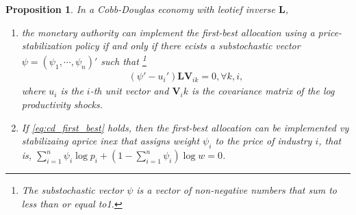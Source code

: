 \documentclass[12pt]{article}
\newtheorem{proposition}{Proposition}
\numberwithin{equation}{section}
\begin{document}
\begin{proposition}
    In a Cobb-Douglas economy with leotief inverse $\mathbf{L}$,
    \begin{enumerate}
        \item the monetary authority can implement the first-best allocation using a price-stabilization policy if and only if there ecists a substochastic vector $\psi = (\psi_1, \cdots, \psi_n)'$ such that \footnote{The substochastic vector $\psi$ is a vector of non-negative numbers that sum to less than or equal to1.}
        \begin{align}\label{eq:cd_first_best}
            (\psi' - u_i') \mathbf{L}\mathbf{V}_{ik}=0, \forall k, i,
        \end{align}
        where $u_i$ is the $i$-th unit vector and $\mathbf{V}_ik$ is the covariance matrix of the log productivity shocks.
        \item If \eqref{eq:cd_first_best} holds, then the first-best allocation can be implemented vy stabilizaing aprice inex that assigns weight $\psi_i$ to the price of industry $i$, that is, $\sum_{i=1}^n \psi_i \log p_i + (1-\sum_{i=1}^n \psi_i) \log w = 0$.
    \end{enumerate}
\end{proposition}
\end{document}
